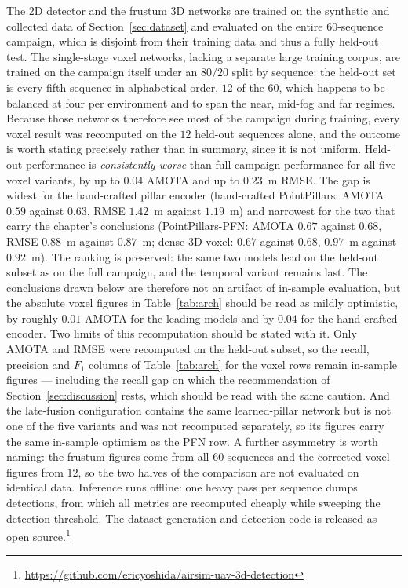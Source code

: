 The 2D detector and the frustum 3D networks are trained on the synthetic and
collected data of Section~\ref{sec:dataset} and evaluated on the entire $60$-sequence
campaign, which is disjoint from their training data and thus a fully held-out test.
The single-stage voxel networks, lacking a separate large training corpus, are
trained on the campaign itself under an $80/20$ split by sequence: the held-out
set is every fifth sequence in alphabetical order, $12$ of the $60$, which happens
to be balanced at four per environment and to span the near, mid-fog and far
regimes. Because those networks therefore see most of the campaign during
training, every voxel result was recomputed on the $12$ held-out sequences alone,
and the outcome is worth stating precisely rather than in summary, since it is not
uniform. Held-out performance is \emph{consistently worse} than full-campaign
performance for all five voxel variants, by up to $0.04$ AMOTA and up to
$0.23$~m RMSE. The gap is widest for the hand-crafted pillar encoder
(hand-crafted PointPillars: AMOTA $0.59$ against $0.63$, RMSE $1.42$~m against
$1.19$~m) and narrowest for the two that carry the chapter's conclusions
(PointPillars-PFN: AMOTA $0.67$ against $0.68$, RMSE $0.88$~m against $0.87$~m;
dense 3D voxel: $0.67$ against $0.68$, $0.97$~m against $0.92$~m). The ranking is
preserved: the same two models lead on the held-out subset as on the full
campaign, and the temporal variant remains last. The conclusions drawn below are
therefore not an artifact of in-sample evaluation, but the absolute voxel figures
in Table~\ref{tab:arch} should be read as mildly optimistic, by roughly $0.01$
AMOTA for the leading models and by $0.04$ for the hand-crafted encoder. Two
limits of this recomputation should be stated with it. Only AMOTA and RMSE were
recomputed on the held-out subset, so the recall, precision and $F_1$ columns of
Table~\ref{tab:arch} for the voxel rows remain in-sample figures --- including the
recall gap on which the recommendation of Section~\ref{sec:discussion} rests, which
should be read with the same caution. And the late-fusion configuration contains
the same learned-pillar network but is not one of the five variants and was not
recomputed separately, so its figures carry the same in-sample optimism as the PFN
row. A further asymmetry is worth naming: the frustum figures come from all $60$
sequences and the corrected voxel figures from $12$, so the two halves of the
comparison are not evaluated on identical data. Inference
runs offline: one heavy pass per sequence dumps detections, from which all metrics
are recomputed cheaply while sweeping the detection threshold. The dataset-generation
and detection code is released as open source.\footnote{\url{https://github.com/ericyoshida/airsim-uav-3d-detection}}

